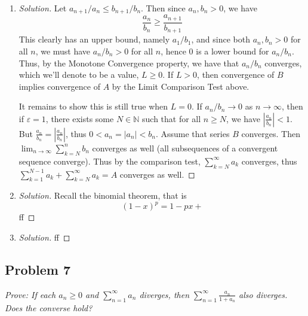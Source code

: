 \documentclass{article}
\newcommand{\N}{{\mathbb N}}
\newcommand{\ep}{{\varepsilon}}
\begin{document}
{\begin{enumerate}
\begin{proof}[Solution]
		Now, note that if $b_n/a_n$ converges to some positive value,
		$a_n/b_n$ must converge to some positive value as well,
		specifically, $L^{-1}$
		(by Rudin Theorem 3.3 (d)),
		since $b_n/a_n \neq0$ for all $n$ and $L\neq0$.
		Thus, we can repeat an identical argument to the one above
		to show that $B$ converging implies $A$ converging
		(where we just swap the $a_n$'s and $b_n$'s around).
	\end{proof}
	\item \begin{proof}[Solution]\let\qed\relax
		Let $a_{n+1}/a_n \leq b_{n+1}/b_n$.
		Then since $a_n,b_n > 0$, we have
		\[
			\frac{a_n}{b_n} \geq \frac{a_{n+1}}{b_{n+1}}
		\]
		This clearly has an upper bound,
		namely $a_1/b_1$,
		and since both $a_n,b_n > 0$ for all $n$, we must have
		$a_n/b_n > 0$ for all $n$,
		hence $0$ is a lower bound for $a_n/b_n$.
		Thus, by the Monotone Convergence property,
		we have that $a_n/b_n$ converges,
		which we'll denote to be a value, $L \geq 0$.
		If $L > 0$,
		then convergence of $B$ implies convergence of $A$
		by the Limit Comparison Test above.

		It remains to show this is still true when $L = 0$.
		If $a_n/b_n \to 0$ as $n \to \infty$,
		then if $\ep = 1$,
		there exists some $N \in \N$ such that for all $n \geq N$,
		we have $\left|\frac{a_n}{b_n}\right| < 1$.
		But $\frac{a_n}{b_n} = \left|\frac{a_n}{b_n}\right|$,
		thus $0 < a_n = |a_n| < b_n$.
		Assume that series $B$ converges.
		Then $\lim_{n\to\infty}\sum_{k=N}^nb_n$ converges as well
		(all subsequences of a convergent sequence converge).
		Thus by the comparison test, $\sum_{k=N}^\infty a_k$ converges,
		thus $\sum_{k=1}^{N-1}a_k + \sum_{k=N}^\infty a_k = A$
		converges as well.
	\end{proof}
	\item \begin{proof}[Solution]\let\qed\relax
		Recall the binomial theorem, that is
		\[
			(1-x)^p = 1 - px + 
		\]
		ff
	\end{proof}
	\item \begin{proof}[Solution]\let\qed\relax
		ff
	\end{proof}
\end{enumerate}
\clearpage

\subsection*{Problem 7}
{\it Prove: If each $a_n \geq 0$ and $\sum_{n=1}^\infty a_n$ diverges,
then $\sum_{n=1}^\infty \frac{a_n}{1+a_n}$ also diverges.
Does the converse hold?}

}
\end{document}
